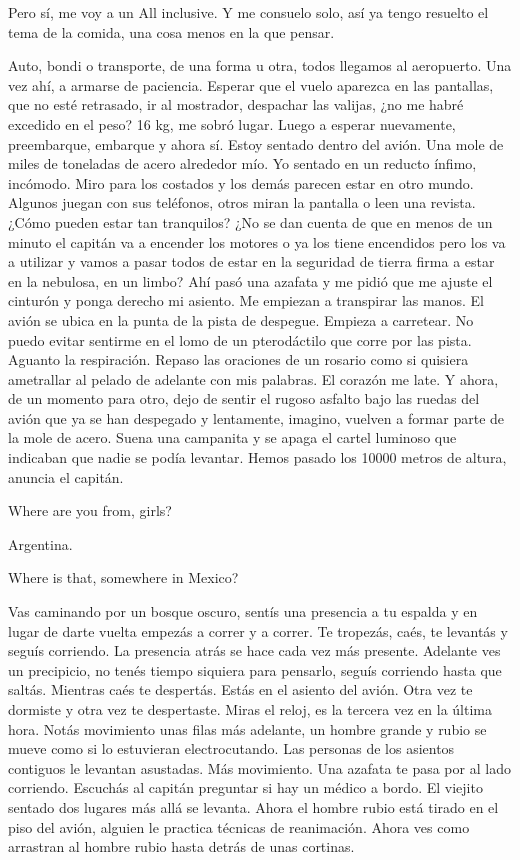\documentclass[11pt,twoside,openright,a6paper]{book}
\begin{document}
Pero sí, me voy a un All inclusive. Y me consuelo solo, así ya tengo resuelto el tema de la comida, una cosa menos en la que pensar.


\vspace{1.5cm}
Auto, bondi o transporte, de una forma u otra, todos llegamos al aeropuerto. Una vez ahí, a armarse de paciencia. Esperar que el vuelo aparezca en las pantallas, que no esté retrasado, ir al mostrador, despachar las valijas, ¿no me habré excedido en el peso? 16 kg, me sobró lugar. Luego a esperar nuevamente, preembarque, embarque y ahora sí. Estoy sentado dentro del avión. Una mole de miles de toneladas de acero alrededor mío. Yo sentado en un reducto ínfimo, incómodo. Miro para los costados y los demás parecen estar en otro mundo. Algunos juegan con sus teléfonos, otros miran la pantalla o leen una revista. ¿Cómo pueden estar tan tranquilos? ¿No se dan cuenta de que en menos de un minuto el capitán va a encender los motores o ya los tiene encendidos pero los va a utilizar y vamos a pasar todos de estar en la seguridad de tierra firma a estar en la nebulosa, en un limbo? Ahí pasó una azafata y me pidió que me ajuste el cinturón y ponga derecho mi asiento. Me empiezan a transpirar las manos. El avión se ubica en la punta de la pista de despegue. Empieza a carretear. No puedo evitar sentirme en el lomo de un pterodáctilo que corre por las pista. Aguanto la respiración. Repaso las oraciones de un rosario como si quisiera ametrallar al pelado de adelante con mis palabras. El corazón me late. Y ahora, de un momento para otro, dejo de sentir el rugoso asfalto bajo las ruedas del avión que ya se han despegado y lentamente, imagino, vuelven a formar parte de la mole de acero. Suena una campanita y se apaga el cartel luminoso que indicaban que nadie se podía levantar. Hemos pasado los 10000 metros de altura, anuncia el capitán.


\vspace{1.5cm}
Where are you from, girls?

Argentina.

Where is that, somewhere in Mexico?


\vspace{1.5cm}
Vas caminando por un bosque oscuro, sentís una presencia a tu espalda y en lugar de darte vuelta empezás a correr y a correr. Te tropezás, caés, te levantás y seguís corriendo. La presencia atrás se hace cada vez más presente. Adelante ves un precipicio, no tenés tiempo siquiera para pensarlo, seguís corriendo hasta que saltás. Mientras caés te despertás. Estás en el asiento del avión. Otra vez te dormiste y otra vez te despertaste. Miras el reloj, es la tercera vez en la última hora. Notás movimiento unas filas más adelante, un hombre grande y rubio se mueve  como si lo estuvieran electrocutando. Las personas de los asientos contiguos le levantan asustadas. Más movimiento. Una azafata te pasa por al lado corriendo. Escuchás al capitán preguntar si hay un médico a bordo. El viejito sentado dos lugares más allá se levanta. Ahora el hombre rubio está tirado en el piso del avión, alguien le practica técnicas de reanimación. Ahora ves como arrastran al hombre rubio hasta detrás de unas cortinas.
\end{document}
